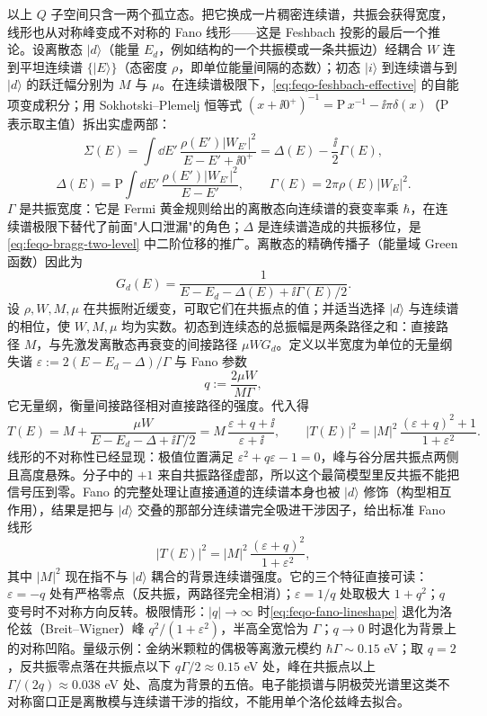 以上 \(Q\) 子空间只含一两个孤立态。把它换成一片稠密连续谱，共振会获得宽度，线形也从对称峰变成不对称的 Fano 线形——这是 Feshbach 投影的最后一个推论。设离散态 \(|d\rangle\)（能量 \(E_d\)，例如结构的一个共振模或一条共振边）经耦合 \(W\) 连到平坦连续谱 \(\{|E\rangle\}\)（态密度 \(\rho\)，即单位能量间隔的态数）；初态 \(|i\rangle\) 到连续谱与到 \(|d\rangle\) 的跃迁幅分别为 \(M\) 与 \(\mu\)。在连续谱极限下，\cref{eq:feqo-feshbach-effective} 的自能项变成积分；用 Sokhotski--Plemelj 恒等式 \((x+\ii0^+)^{-1}=\mathrm{P}\,x^{-1}-\ii\pi\delta(x)\)（\(\mathrm P\) 表示取主值）拆出实虚两部：
\begin{equation}
\Sigma(E)=\int\dd E'\,\frac{\rho(E')|W_{E'}|^2}{E-E'+\ii0^+}
=\Delta(E)-\frac{\ii}{2}\Gamma(E),
\label{eq:feqo-fano-selfenergy}
\end{equation}
\begin{equation}
\Delta(E)=\mathrm{P}\!\int\dd E'\,\frac{\rho(E')|W_{E'}|^2}{E-E'},
\qquad
\Gamma(E)=2\pi\rho(E)|W_E|^2 .
\label{eq:feqo-fano-width-shift}
\end{equation}
\(\Gamma\) 是共振宽度：它是 Fermi 黄金规则给出的离散态向连续谱的衰变率乘 \(\hbar\)，在连续谱极限下替代了前面"人口泄漏"的角色；\(\Delta\) 是连续谱造成的共振移位，是\cref{eq:feqo-bragg-two-level} 中二阶位移的推广。离散态的精确传播子（能量域 Green 函数）因此为
\[
G_d(E)=\frac{1}{E-E_d-\Delta(E)+\ii\Gamma(E)/2}.
\]
设 \(\rho,W,M,\mu\) 在共振附近缓变，可取它们在共振点的值；并适当选择 \(|d\rangle\) 与连续谱的相位，使 \(W,M,\mu\) 均为实数。初态到连续态的总振幅是两条路径之和：直接路径 \(M\)，与先激发离散态再衰变的间接路径 \(\mu W G_d\)。定义以半宽度为单位的无量纲失谐 \(\varepsilon:=2(E-E_d-\Delta)/\Gamma\) 与 Fano 参数
\begin{equation}
q:=\frac{2\mu W}{M\Gamma},
\label{eq:feqo-fano-q}
\end{equation}
它无量纲，衡量间接路径相对直接路径的强度。代入得
\[
T(E)=M+\frac{\mu W}{E-E_d-\Delta+\ii\Gamma/2}
=M\,\frac{\varepsilon+q+\ii}{\varepsilon+\ii},
\qquad
|T(E)|^2=|M|^2\,\frac{(\varepsilon+q)^2+1}{1+\varepsilon^2}.
\]
线形的不对称性已经显现：极值位置满足 \(\varepsilon^2+q\varepsilon-1=0\)，峰与谷分居共振点两侧且高度悬殊。分子中的 \(+1\) 来自共振路径虚部，所以这个最简模型里反共振不能把信号压到零。Fano 的完整处理让直接通道的连续谱本身也被 \(|d\rangle\) 修饰（构型相互作用），结果是把与 \(|d\rangle\) 交叠的那部分连续谱完全吸进干涉因子，给出标准 Fano 线形
\begin{equation}
|T(E)|^2=|M|^2\,\frac{(\varepsilon+q)^2}{1+\varepsilon^2},
\label{eq:feqo-fano-lineshape}
\end{equation}
其中 \(|M|^2\) 现在指不与 \(|d\rangle\) 耦合的背景连续谱强度。它的三个特征直接可读：\(\varepsilon=-q\) 处有严格零点（反共振，两路径完全相消）；\(\varepsilon=1/q\) 处取极大 \(1+q^2\)；\(q\) 变号时不对称方向反转。极限情形：\(|q|\to\infty\) 时\cref{eq:feqo-fano-lineshape} 退化为洛伦兹（Breit--Wigner）峰 \(q^2/(1+\varepsilon^2)\)，半高全宽恰为 \(\Gamma\)；\(q\to0\) 时退化为背景上的对称凹陷。量级示例：金纳米颗粒的偶极等离激元模约 \(\hbar\Gamma\sim0.15\) eV；取 \(q=2\)，反共振零点落在共振点以下 \(q\Gamma/2\approx0.15\) eV 处，峰在共振点以上 \(\Gamma/(2q)\approx0.038\) eV 处、高度为背景的五倍。电子能损谱与阴极荧光谱里这类不对称窗口正是离散模与连续谱干涉的指纹，不能用单个洛伦兹峰去拟合。


